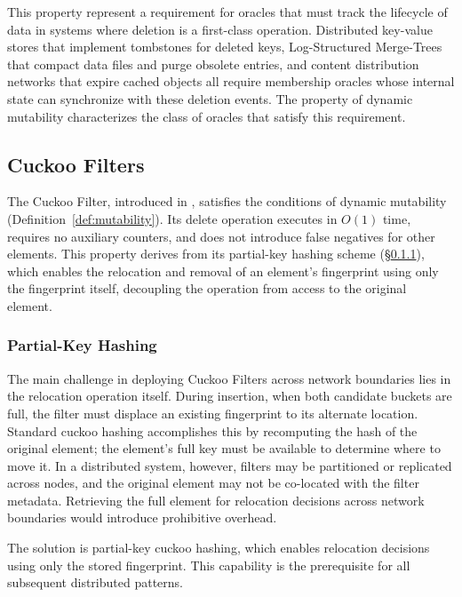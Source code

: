 This property represent a requirement for oracles that must track the lifecycle of data in systems where deletion is a first-class operation. Distributed key-value stores that implement tombstones for deleted keys, Log-Structured Merge-Trees that compact data files and purge obsolete entries, and content distribution networks that expire cached objects all require membership oracles whose internal state can synchronize with these deletion events. The property of dynamic mutability characterizes the class of oracles that satisfy this requirement.

\subsection{Cuckoo Filters} \label{subsec:cuckoo-filters}

The Cuckoo Filter, introduced in \cite{Fan2014CuckooFP}, satisfies the conditions of dynamic mutability (Definition~\ref{def:mutability}). Its delete operation executes in $O(1)$ time, requires no auxiliary counters, and does not introduce false negatives for other elements. This property derives from its partial-key hashing scheme (\S\ref{subsubsec:partial-key-hashing}), which enables the relocation and removal of an element's fingerprint using only the fingerprint itself, decoupling the operation from access to the original element.

\subsubsection{Partial-Key Hashing} \label{subsubsec:partial-key-hashing}

The main challenge in deploying Cuckoo Filters across network boundaries lies in the relocation operation itself. During insertion, when both candidate buckets are full, the filter must displace an existing fingerprint to its alternate location. Standard cuckoo hashing accomplishes this by recomputing the hash of the original element; the element's full key must be available to determine where to move it. In a distributed system, however, filters may be partitioned or replicated across nodes, and the original element may not be co-located with the filter metadata. Retrieving the full element for relocation decisions across network boundaries would introduce prohibitive overhead.

The solution is partial-key cuckoo hashing, which enables relocation decisions using only the stored fingerprint. This capability is the prerequisite for all subsequent distributed patterns.

